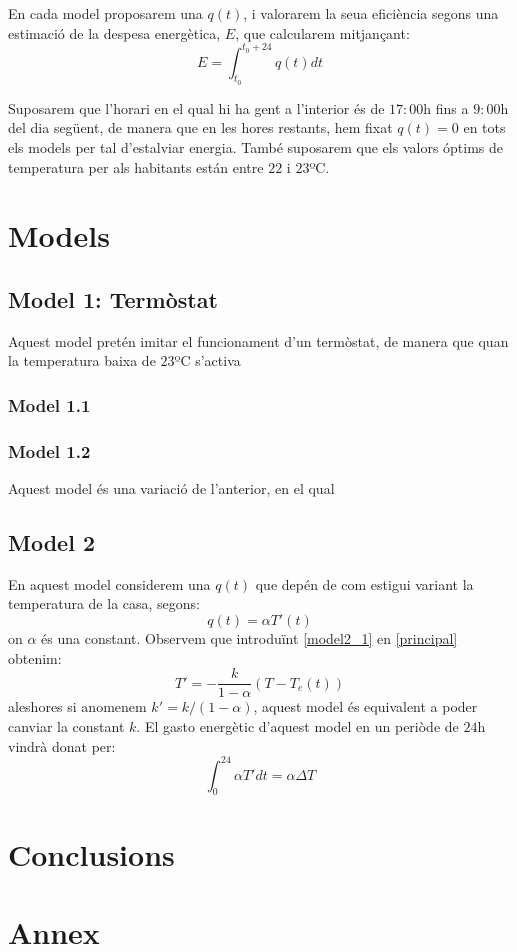 \documentclass[11pt]{article}
\begin{document}
En cada model proposarem una $q(t)$, i valorarem la seua eficiència segons una estimació de la despesa energètica, $E$, que calcularem mitjançant:\\
\begin{equation}
	E=\int^{t_0+24}_{t_0} q(t)dt
\end{equation}

Suposarem que l'horari en el qual hi ha gent a l'interior és de $17:00$h fins a $9:00$h del dia següent, de manera que en les hores restants, hem fixat $q(t)=0$ en tots els models per tal d'estalviar energia. També suposarem que els valors óptims de temperatura per als habitants están entre $22$ i $23$ºC.\\
\section*{Models}
	\subsection{Model 1: Termòstat}
	Aquest model pretén imitar el funcionament d'un termòstat, de manera que quan la temperatura baixa de $23$ºC s'activa 
	\subsubsection*{Model 1.1}
	\subsubsection*{Model 1.2}
	Aquest model és una variació de l'anterior, en el qual 
	\subsection{Model 2}
	En aquest model considerem una $q(t)$ que depén de com estigui variant la temperatura de la casa, segons:
	\begin{equation}\label{model2_1}
		q(t)=\alpha T'(t)
	\end{equation}
	on $\alpha$ és una constant. Observem que introduïnt \eqref{model2_1} en \eqref{principal} obtenim:
	\begin{equation}
		T'=-\frac{k}{1-\alpha}(T-T_e(t))
	\end{equation}
	aleshores si anomenem $k'=k/(1-\alpha)$, aquest model és equivalent a poder canviar la constant $k$.
	El gasto energètic d'aquest model en un periòde de $24$h vindrà donat per:
	\begin{equation}
		\int_{0}^{24}\alpha T'dt=\alpha\Delta T
	\end{equation}
\section*{Conclusions}
\section*{Annex}
\end{document}
